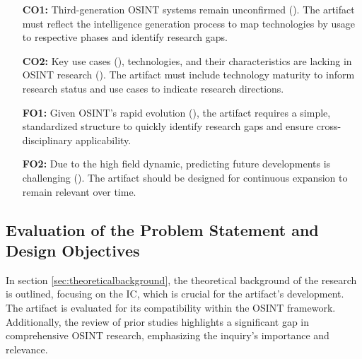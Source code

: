 \documentclass[10pt]{article}
\begin{document}
\begin{itemize}
    \item[\textbf{CO1:}] Third-generation OSINT systems remain unconfirmed (\cite{Ghioni.2023}). The artifact must reflect the intelligence generation process to map technologies by usage to respective phases and identify research gaps.
    \item[\textbf{CO2:}] Key use cases (\cite{AlKilani.2021, Dokman.2020, Ghioni.2023}), technologies, and their characteristics are lacking in OSINT research (\cite{Ish.2022}). The artifact must include technology maturity to inform research status and use cases to indicate research directions.
    \item[\textbf{FO1:}] Given OSINT's rapid evolution (\cite{Ghioni.2023}), the artifact requires a simple, standardized structure to quickly identify research gaps and ensure cross-disciplinary applicability.
    \item[\textbf{FO2:}] Due to the high field dynamic, predicting future developments is challenging (\cite{Benes.2013}). The artifact should be designed for continuous expansion to remain relevant over time.
\end{itemize}

\subsection{Evaluation of the Problem Statement and Design Objectives} \label{sec:eval}
In section \ref{sec:theoreticalbackground}, the theoretical background of the research is outlined, focusing on the IC, which is crucial for the artifact's development. The artifact is evaluated for its compatibility within the OSINT framework. Additionally, the review of prior studies highlights a significant gap in comprehensive OSINT research, emphasizing the inquiry's importance and relevance.
\end{document}
